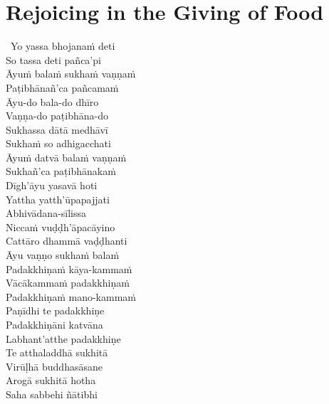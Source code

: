 \fi

\suttaRef{[Thai]}

\clearpage



\section{Rejoicing in the Giving of Food}
\label{rejoing-in-giving-food}

\ifninebythirteen\vspace{0.25em}\fi

\begin{verses}
  \anglebracketleft\ \hspace{-0.5mm}Yo yassa bhojanaṁ deti \hspace{-0.5mm}\anglebracketright\ \\
  So tassa deti pañca'pi\\
  Āyuṁ balaṁ sukhaṁ vaṇṇaṁ\\
  Paṭibhānañ'ca pañcamaṁ\makeatletter\hyperlink{endnote122-appendix}\makeatother\\
  Āyu-do bala-do dhīro\\
  Vaṇṇa-do paṭibhāna-do\\
  Sukhassa dātā medhāvī\\
  Sukhaṁ so adhigacchati\\
  Āyuṁ datvā balaṁ vaṇṇaṁ\\
  Sukhañ'ca paṭibhānakaṁ\ifdigital\makeatletter\hyperlink{endnote123-appendix}\makeatother\fi\\
  Dīgh'āyu yasavā hoti\\
  Yattha yatth'ūpapajjati\\
  Abhivādana-sīlissa\\
  Niccaṁ vuḍḍh'āpacāyino\\
  Cattāro dhammā vaḍḍhanti\\
  Āyu vaṇṇo sukhaṁ balaṁ\\
  Padakkhiṇaṁ kāya-kammaṁ\\
  Vācākammaṁ padakkhiṇaṁ\\
  Padakkhiṇaṁ mano-kammaṁ\\
  Paṇīdhi te padakkhiṇe\\
  Padakkhiṇāni katvāna\\
  Labhant'atthe padakkhiṇe\\
  Te atthaladdhā sukhitā\\
  Virūḷhā buddhasāsane\\
\ifbfive\enlargethispage{1.2\baselineskip}\fi
  Arogā sukhitā hotha\\
  Saha sabbehi ñātibhi
\end{verses}


